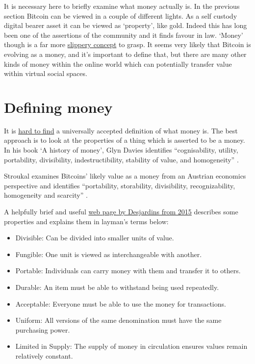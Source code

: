 It is necessary here to briefly examine what money actually is. In the previous section Bitcoin can be viewed in a couple of different lights. As a self custody digital bearer asset it can be viewed as `property', like gold. Indeed this has long been one of the assertions of the community and it finds favour in law. `Money' though is a far more \href{https://www.bankofengland.co.uk/knowledgebank/what-is-money}{slippery concept} to grasp. It seems very likely that Bitcoin is evolving as a money, and it's important to define that, but there are many other kinds of money within the online world which can potentially transfer value within virtual social spaces.
\section{Defining money}
It is \href{https://www.lynalden.com/what-is-money/}{hard to find} a universally accepted definition of what money is. The best approach is to look at the properties of a thing which is asserted to be a money. In his book `A history of money', Glyn Davies identifies ``cognisability, utility,  portability, divisibility, indestructibility, stability of value, and homogeneity'' \cite{davies2010history}.\par
Stroukal examines Bitcoins' likely value as a money from an Austrian economics perspective and identifies ``portability, storability, divisibility, recognizability, homogeneity and scarcity'' \cite{stroukal2018can}.\par
A helpfully brief and useful \href{http://money.visualcapitalist.com/infographic-the-properties-of-money/}{web page by Desjardins from 2015} describes some properties and explains them in layman's terms below:
\begin{itemize}
\item Divisible: Can be divided into smaller units of value.
\item Fungible: One unit is viewed as interchangeable with another.
\item Portable: Individuals can carry money with them and transfer it to others.
\item Durable: An item must be able to withstand being used repeatedly.
\item Acceptable: Everyone must be able to use the money for transactions.
\item Uniform: All versions of the same denomination must have the same purchasing power.
\item Limited in Supply: The supply of money in circulation ensures values remain relatively constant.
\end{itemize}
